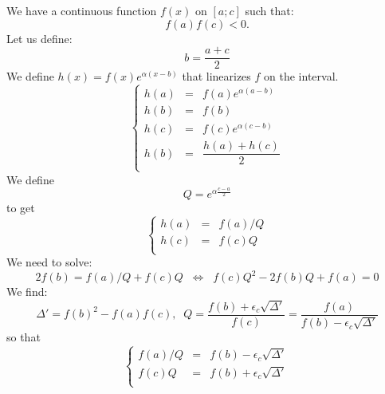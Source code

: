 \documentclass[aps,12pt]{revtex4}
\begin{document}
We have a continuous function $f(x)$ on $[a;c]$ such that:
 $$f(a)f(c)<0.$$
Let us define:
$$
	b = \dfrac{a+c}{2}
$$
We define $h(x)=f(x)e^{\alpha(x-b)}$ that linearizes $f$ on the interval.
$$
\left\lbrace
\begin{array}{rcl}
	h(a) & = & f(a)e^{\alpha(a-b)}\\
	h(b) & = & f(b)\\
	h(c) & = & f(c) e^{\alpha(c-b)}\\
	h(b) & = & \dfrac{h(a)+h(c)}{2}\\
\end{array}
\right.
$$
We define
$$
Q = e^{\alpha\frac{c-a}{2}}
$$
to get
$$	
\left\lbrace
\begin{array}{rcl}
	h(a) & = & f(a)/Q\\
 	h(c) & = & f(c)Q\\
\end{array}
\right.
$$
We need to solve:
$$
	2f(b) = f(a)/Q+f(c)Q \;\; \Leftrightarrow \;\; f(c)Q^2 - 2 f(b) Q + f(a) = 0
$$
We find:
$$
	\Delta' = f(b)^2 - f(a)f(c), \;\; Q = \dfrac{f(b)+\epsilon_c \sqrt{\Delta'}}{f(c)} = \dfrac{f(a)}{f(b)-\epsilon_c \sqrt{\Delta'}}
$$
so that
$$
\left\lbrace
\begin{array}{rcl}
	f(a)/Q & = & f(b) - \epsilon_c \sqrt{\Delta'}\\
	f(c) Q & = & f(b) + \epsilon_c \sqrt{\Delta'}\\
\end{array}
\right.
$$
\end{document}
